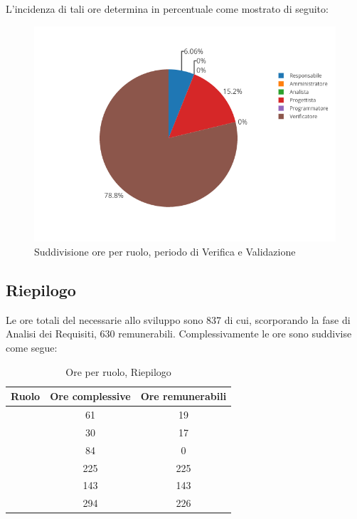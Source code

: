L'incidenza di tali ore determina in percentuale come mostrato di seguito:
\begin{figure}[H]
	\centering
	\includegraphics[scale=0.6]{img/Validazione.png}
	\caption{Suddivisione ore per ruolo, periodo di Verifica e Validazione}
\end{figure}

\subsection{Riepilogo}
Le ore totali del necessarie allo sviluppo sono 837 di cui, scorporando la fase di Analisi dei Requisiti, 630 remunerabili. Complessivamente le ore sono suddivise come segue:

\begin{table}[H]
	\begin{center}
		\begin{tabular}{|c|c|c|}
			\hline
			\textbf{Ruolo}	& \textbf{Ore complessive} & \textbf{Ore remunerabili} \\
			\hline
			\Res	&	61	&	19	\\
			\hline
			\Amm	&	30	&	17	\\
			\hline
			\Ana	&	84	&	0	\\
			\hline
			\Prog	&	225	&	225	\\
			\hline
			\Progr	&	143	&	143	\\
			\hline
			\Ver	&	294	&	226	\\
			\hline
		\end{tabular}
	\end{center}
	\caption{Ore per ruolo, Riepilogo}
\end{table}

